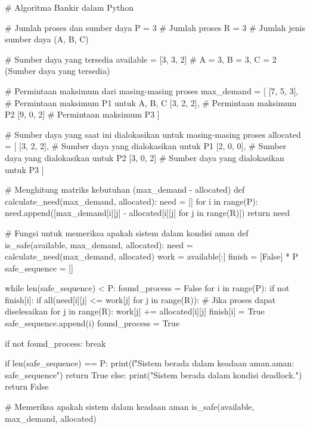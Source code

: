\documentclass[12pt]{article}
\begin{document}
\begin{python}
    
    # Algoritma Bankir dalam Python
    
    # Jumlah proses dan sumber daya
    P = 3  # Jumlah proses
    R = 3  # Jumlah jenis sumber daya (A, B, C)
    
    # Sumber daya yang tersedia
    available = [3, 3, 2]  # A = 3, B = 3, C = 2 (Sumber daya yang tersedia)
    
    # Permintaan maksimum dari masing-masing proses
    max_demand = [
        [7, 5, 3],  # Permintaan maksimum P1 untuk A, B, C
        [3, 2, 2],  # Permintaan maksimum P2
        [9, 0, 2]   # Permintaan maksimum P3
    ]
    
    # Sumber daya yang saat ini dialokasikan untuk masing-masing proses
    allocated = [
        [3, 2, 2],  # Sumber daya yang dialokasikan untuk P1
        [2, 0, 0],  # Sumber daya yang dialokasikan untuk P2
        [3, 0, 2]   # Sumber daya yang dialokasikan untuk P3
    ]
    
    # Menghitung matriks kebutuhan (max_demand - allocated)
    def calculate_need(max_demand, allocated):
        need = []
        for i in range(P):
            need.append([max_demand[i][j] - allocated[i][j] for j in range(R)])
        return need
    
    # Fungsi untuk memeriksa apakah sistem dalam kondisi aman
    def is_safe(available, max_demand, allocated):
        need = calculate_need(max_demand, allocated)
        work = available[:]
        finish = [False] * P
        safe_sequence = []
    
        while len(safe_sequence) < P:
            found_process = False
            for i in range(P):
                if not finish[i]:
                    if all(need[i][j] <= work[j] for j in range(R)):
                        # Jika proses dapat diselesaikan
                        for j in range(R):
                            work[j] += allocated[i][j]
                        finish[i] = True
                        safe_sequence.append(i)
                        found_process = True
    
            if not found_process:
                break
    
        if len(safe_sequence) == P:
            print(f"Sistem berada dalam keadaan aman.\nUrutan aman: {safe_sequence}")
            return True
        else:
            print("Sistem berada dalam kondisi deadlock.")
            return False
    
    # Memeriksa apakah sistem dalam keadaan aman
    is_safe(available, max_demand, allocated)
\end{python}
\end{document}
